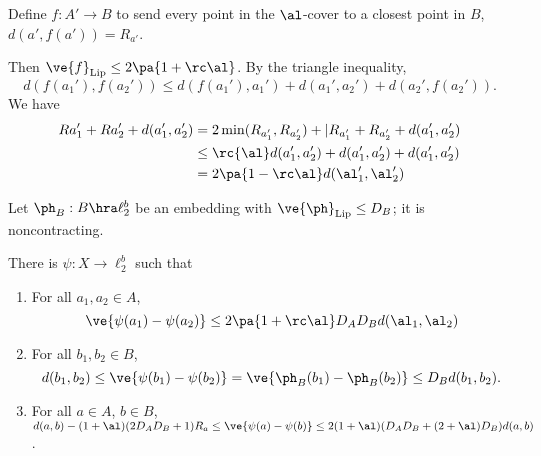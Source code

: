 \begin{lem}
Define $f:A'\to B$ to send every point in the $\al$-cover to a closest point in $B$, $d(a',f(a'))=R_{a'}$. 

Then $\ve{f}_{\text{Lip}}\le 2\pa{1+\rc\al}$. 
By the triangle inequality,
\[
d(f(a_1'), f(a_2')) \le d(f(a_1'), a_1') + d(a_1',a_2') + d(a_2',f(a_2')).
\]
We have
\begin{align}
Ra_1' + Ra_2' + d(a_1',a_2') &= 2 \min (R_{a_1'}, R_{a_2'}) + |R_{a_1'} + R_{a_2'} + d(a_1',a_2')\\
& \le \rc{\al} d(a_1',a_2') + d(a_1',a_2') + d(a_1',a_2')\\
&=2\pa{1-\rc \al} d(\al_1' ,\al_2')
\end{align}
\end{lem}

Let $\ph_B:B\hra \ell_2^b$ be an embedding with $\ve{\ph}_{\text{Lip}}\le D_B$; it is noncontracting.

\begin{lem}
There is $\psi:X\to \ell_2^b$ such that 
\begin{enumerate}
\item
For all $a_1,a_2\in A$, 
\[
\ve{\psi(a_1) - \psi(a_2)} \le 2\pa{1+\rc\al} D_AD_B d(\al_1,\al_2)
\]
\item
For all $b_1,b_2\in B$,
\[
d(b_1,b_2) \le \ve{\psi(b_1)-\psi(b_2)} = \ve{\ph_B(b_1)-\ph_B(b_2)} \le D_Bd(b_1,b_2).
\]
\item
For all $a\in A$, $b\in B$, $d(a,b)-(1+\al)(2D_AD_B+1)R_a\le \ve{\psi(a)-\psi(b)} \le 2(1+\al) (D_AD_B+(2+\al)D_B) d(a,b)$.
\end{enumerate}
\end{lem}

